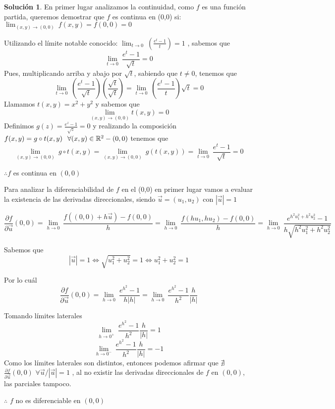 \documentclass[10pt, a4paper]{report}
\theoremstyle{definition} %
\newtheorem{solution}{Solución}
\begin{document}
\begin{solution}
    En primer lugar analizamos la continuidad, como $f$ es una función partida, queremos demostrar que $f$ es continua en (0,0) si:  $\lim_{(x,y)\to(0,0)} \ f(x,y) = f(0,0)=0$

 
Utilizando el límite notable conocido:  $ \lim_{t\to 0} \
        (\frac{e^{t}-1}{t})=1$ , sabemos que 
\[
        \lim_{t\to 0} \
        \frac{e^{t}-1}{\sqrt{t}}=0 
    \]
    Pues, multiplicando arriba y abajo por $\sqrt{t}$, sabiendo que $t\neq 0$, tenemos que
    \[
        \lim_{t\to 0} \
        (\frac{e^{t}-1}{\sqrt{t}})(\frac{\sqrt{t}}{\sqrt{t}}) =\lim_{t\to 0} \
        (\frac{e^{t}-1}{t})\sqrt{t}=0
    \]
    Llamamos  $t(x,y)=x^{2}+y^{2}$ y sabemos que 
   \[
        \lim_{(x,y)\to(0,0)} t(x,y)=0
    \]
    Definimos $g(z)=\frac{e^{z}-1}{\sqrt{z}}=0 $ y realizando la composición $f(x,y)=g\circ t(x,y) \hspace{0.25cm}\forall (x,y)\in \mathbb{R}^ 2 -(0,0)$ tenemos que
\[
        \lim_{(x,y)\to (0,0)} \
        g\circ t(x,y)=\lim_{(x,y)\to (0,0)} \
        g(t(x,y))=\lim_{t\to 0} \
        \frac{e^{t}-1}{\sqrt{t}}=0 
    \]
    
   $\therefore f$ es continua en $(0,0)$
   

    Para analizar la diferenciabilidad de $f$ en el (0,0) en primer lugar vamos a evaluar la existencia de las derivadas direccionales, siendo $\vec{u}=(u_1,u_2)$ con $|\vec{u}|=1$
    
  \[
\displaystyle\frac{\partial f}{\partial \vec{u}}(0,0)=  \lim_{h\to 0} \
        \frac{f((0,0)+h\vec{u})-f(0,0)}{h}=  \lim_{h\to 0} \
        \frac{f(hu_1,hu_2)-f(0,0)}{h}= \lim_{h\to 0} \
        \frac{e^{h^2u_1^2+h^2u_2^2}-1}{h\sqrt{h^2u_1^2+h^2u_2^2}} 
 \]
 
  Sabemos que 
         \[
       |\vec{u}|=1   \iff \sqrt{u_1^2+u_2^2}=1  \iff u_1^2+u_2^2 =1
        \]
         
          Por lo cuál
 \[
\displaystyle\frac{\partial f}{\partial \vec{u}}(0,0)=   \lim_{h\to 0} \
        \frac{e^{h^2}-1}{h|h|} = \lim_{h\to 0} \
        \frac{e^{h^2}-1}{h^2}\frac{h}{|h|}
 \]

Tomando límites laterales
\[
\lim_{h\to 0^+} \
        \frac{e^{h^2}-1}{h^2}\frac{h}{|h|}=1
        \]
\[   
    \lim_{h\to 0^-} \
    \frac{e^{h^2}-1}{h^2}\frac{h}{|h|}=-1 
\]
 Como los límites laterales son distintos, entonces podemos afirmar que $\nexists   $ 
  $ \displaystyle\frac{\partial f}{\partial \vec{u}}(0,0)    $       $     \forall \vec{u} /|\vec{u}|=1$ , al no existir las derivadas direccionales de $f$ en $(0,0)$, las parciales tampoco.

  $\therefore $  $f$ no es diferenciable en $(0,0)$
\end{solution}
\end{document}
